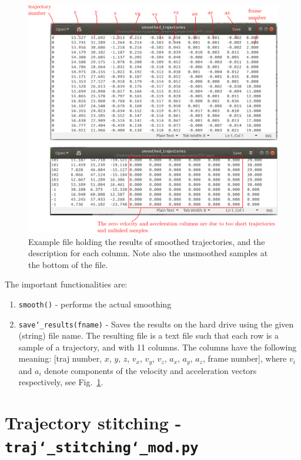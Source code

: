 \documentclass[10pt,a4paper]{article}
\begin{document}
\begin{figure}[h!]
	\centering
	\includegraphics[width=12cm]{smoothed_trajfile.pdf}
	\caption{Example file holding the results of smoothed trajectories, and the description for each column. Note also the unsmoothed samples at the bottom of the file. \label{fig:smoothedfile}}
\end{figure}

The important functionalities are:

\begin{enumerate}
	\item \texttt{smooth()} - performs the actual smoothing
	\item \texttt{save\char`_results(fname)} - Saves the results on the hard drive using the given (string) file name. The resulting file is a text file such that each row is a sample of a trajectory, and with 11 columns. The columns have the following meaning:
	[traj number, $x$, $y$, $z$, $v_x$, $v_y$, $v_z$, $a_x$, $a_y$, $a_z$, frame number], where $v_i$ and $a_i$ denote components of the velocity and acceleration vectors respectively, see Fig.~\ref{fig:smoothedfile}.
\end{enumerate}







\section{Trajectory stitching - \texttt{traj\char`_stitching\char`_mod.py}}
\end{document}

